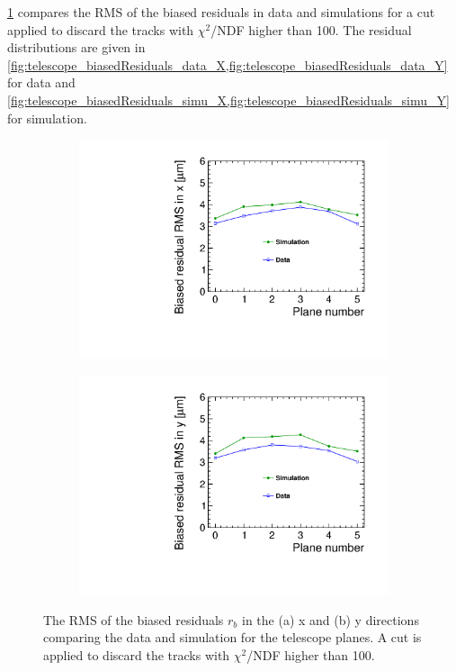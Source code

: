\cref{fig:telescopeBiasedRMS_data_simu} compares the RMS of the biased
residuals in data and simulations for a cut applied to discard the
tracks with $\chi^2$/NDF higher than 100. The residual distributions
are given in
\cref{fig:telescope_biasedResiduals_data_X,fig:telescope_biasedResiduals_data_Y}
for data and
\cref{fig:telescope_biasedResiduals_simu_X,fig:telescope_biasedResiduals_simu_Y}
for simulation.

\begin{figure}[htbp] \centering
  \begin{subfigure}[b]{0.45\textwidth}
    \includegraphics[width=\textwidth]{figures/Telescope/biasedResiduals/RMSX_simu_vs_data.pdf}
    \caption{}
  \end{subfigure}\hfill
  \begin{subfigure}[b]{0.45\textwidth}
    \includegraphics[width=\textwidth]{figures/Telescope/biasedResiduals/RMSY_simu_vs_data.pdf}
    \caption{}
  \end{subfigure}
  \caption{The RMS of the biased residuals $r_b$ in the (a) x and (b) y
    directions comparing the data and simulation for the telescope
    planes. A cut is applied to discard the tracks with $\chi^2$/NDF
    higher than 100.}
  \label{fig:telescopeBiasedRMS_data_simu}
\end{figure}

